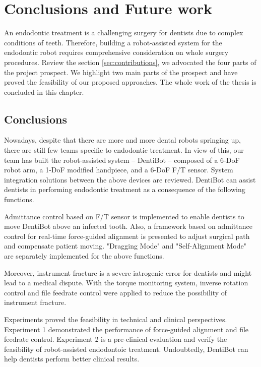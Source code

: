 \chapter{Conclusions and Future work}
\label{chapter7}
\hspace*{6mm}An endodontic treatment is a challenging surgery for dentists due to complex conditions of teeth. Therefore, building a robot-assisted system for the endodontic robot requires comprehensive consideration on whole surgery procedures. Review the section \ref{sec:contributions}, we advocated the four parts of the project prospect. We highlight two main parts of the prospect and have proved the feasibility of our proposed approaches. The whole work of the thesis is concluded in this chapter.
\section{Conclusions}
\hspace*{6mm}Nowadays, despite that there are more and more dental robots springing up, there are still few teams specific to endodontic treatment. In view of this, our team has built the robot-assisted system -- DentiBot -- composed of a 6-DoF robot arm, a 1-DoF modified handpiece, and a 6-DoF F/T sensor. System integration solutions between the above devices are reviewed. DentiBot can assist dentists in performing endodontic treatment as a consequence of the following functions. 
\par
Admittance control based on F/T sensor is implemented to enable dentists to move DentiBot above an infected tooth. Also, a framework based on admittance control for real-time force-guided alignment is presented to adjust surgical path and compensate patient moving. "Dragging Mode" and "Self-Alignment Mode" are separately implemented for the above functions.
\par
Moreover, instrument fracture is a severe iatrogenic error for dentists and might lead to a medical dispute. With the torque monitoring system, inverse rotation control and file feedrate control were applied to reduce the possibility of instrument fracture. 
\par
Experiments proved the feasibility in technical and clinical perspectives. Experiment 1 demonstrated the performance of force-guided alignment and file feedrate control. Experiment 2 is a pre-clinical evaluation and verify the feasibility of robot-assisted endodontoic treatment. Undoubtedly, DentiBot can help dentists perform better clinical results.
